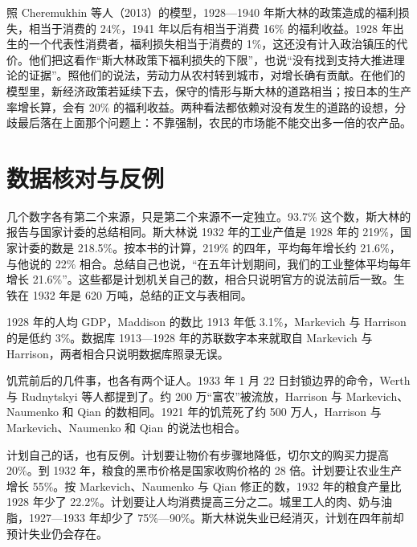 照 Cheremukhin 等人（2013）的模型，1928—1940 年斯大林的政策造成的福利损失，相当于消费的 24\%，1941 年以后有相当于消费 16\% 的福利收益\cite{cggt2013}。1928 年出生的一个代表性消费者，福利损失相当于消费的 1\%，这还没有计入政治镇压的代价\cite{cggt2013}。他们把这看作“斯大林政策下福利损失的下限”，也说“没有找到支持大推进理论的证据”\cite{cggt2013}。照他们的说法，劳动力从农村转到城市，对增长确有贡献\cite{cggt2013}。在他们的模型里，新经济政策若延续下去，保守的情形与斯大林的道路相当；按日本的生产率增长算，会有 20\% 的福利收益\cite{cggt2013}。两种看法都依赖对没有发生的道路的设想，分歧最后落在上面那个问题上：不靠强制，农民的市场能不能交出多一倍的农产品。

\section{数据核对与反例}\label{sec:soviet-check}

几个数字各有第二个来源，只是第二个来源不一定独立。93.7\% 这个数，斯大林的报告与国家计委的总结相同\cite{stalin1933,gosplan1933}。斯大林说 1932 年的工业产值是 1928 年的 219\%，国家计委的数是 218.5\%\cite{stalin1933,gosplan1933}。按本书的计算，219\% 的四年，平均每年增长约 21.6\%，与他说的 22\% 相合。总结自己也说，“在五年计划期间，我们的工业整体平均每年增长 21.6\%”\cite{gosplan1933}。这些都是计划机关自己的数，相合只说明官方的说法前后一致。生铁在 1932 年是 620 万吨，总结的正文与表相同\cite{gosplan1933}。

1928 年的人均 GDP，Maddison 的数比 1913 年低 3.1\%，Markevich 与 Harrison 的是低约 3\%\cite{mpd2023,markevich2011}。数据库 1913—1928 年的苏联数字本来就取自 Markevich 与 Harrison，两者相合只说明数据库照录无误\cite{mpd31src}。

饥荒前后的几件事，也各有两个证人。1933 年 1 月 22 日封锁边界的命令，Werth 与 Rudnytskyi 等人都提到了\cite{werth2016,rudnytskyi2015}。约 200 万“富农”被流放，Harrison 与 Markevich、Naumenko 和 Qian 的数相同\cite{harrison2017,mnq2021}。1921 年的饥荒死了约 500 万人，Harrison 与 Markevich、Naumenko 和 Qian 的说法也相合\cite{harrison2017,mnq2021}。

计划自己的话，也有反例。计划要让物价有步骤地降低，切尔文的购买力提高 20\%\cite{gosplan1929}。到 1932 年，粮食的黑市价格是国家收购价格的 28 倍\cite{cggt2013}。计划要让农业生产增长 55\%\cite{gosplan1929}。按 Markevich、Naumenko 与 Qian 修正的数，1932 年的粮食产量比 1928 年少了 22.2\%\cite{mnq2021}。计划要让人均消费提高三分之二\cite{harrison2017}。城里工人的肉、奶与油脂，1927—1933 年却少了 75\%—90\%\cite{werth2016}。斯大林说失业已经消灭，计划在四年前却预计失业仍会存在\cite{stalin1933,gosplan1929}。

